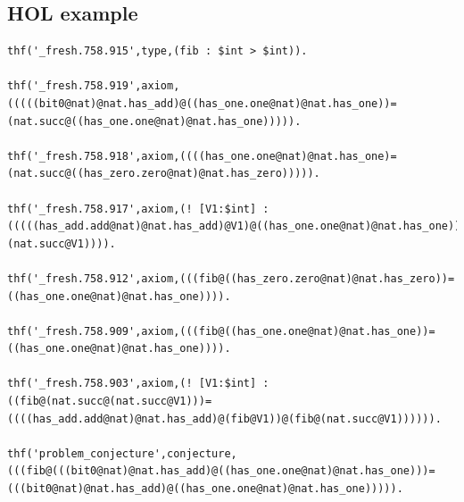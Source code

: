 \documentclass[a4paper]{article}
\begin{document}
\subsection{HOL example}
\label{sec:hol_example}
\begin{verbatim}
thf('_fresh.758.915',type,(fib : $int > $int)).

thf('_fresh.758.919',axiom,(((((bit0@nat)@nat.has_add)@((has_one.one@nat)@nat.has_one))=
(nat.succ@((has_one.one@nat)@nat.has_one))))).

thf('_fresh.758.918',axiom,((((has_one.one@nat)@nat.has_one)=(nat.succ@((has_zero.zero@nat)@nat.has_zero))))).

thf('_fresh.758.917',axiom,(! [V1:$int] : (((((has_add.add@nat)@nat.has_add)@V1)@((has_one.one@nat)@nat.has_one))=
(nat.succ@V1)))).

thf('_fresh.758.912',axiom,(((fib@((has_zero.zero@nat)@nat.has_zero))=((has_one.one@nat)@nat.has_one)))).

thf('_fresh.758.909',axiom,(((fib@((has_one.one@nat)@nat.has_one))=((has_one.one@nat)@nat.has_one)))).

thf('_fresh.758.903',axiom,(! [V1:$int] : ((fib@(nat.succ@(nat.succ@V1)))=
((((has_add.add@nat)@nat.has_add)@(fib@V1))@(fib@(nat.succ@V1)))))).

thf('problem_conjecture',conjecture,(((fib@(((bit0@nat)@nat.has_add)@((has_one.one@nat)@nat.has_one)))=
(((bit0@nat)@nat.has_add)@((has_one.one@nat)@nat.has_one))))).
\end{verbatim}
\end{document}
